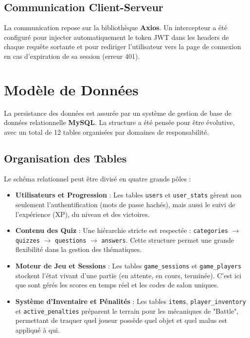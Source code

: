 \documentclass[12pt,a4paper]{article}
\begin{document}
\subsection{Communication Client-Serveur}
La communication repose sur la bibliothèque \textbf{Axios}. Un intercepteur a été configuré pour injecter automatiquement le token JWT dans les headers de chaque requête sortante et pour rediriger l'utilisateur vers la page de connexion en cas d'expiration de sa session (erreur 401).


\section{Modèle de Données}

La persistance des données est assurée par un système de gestion de base de données relationnelle \textbf{MySQL}. La structure a été pensée pour être évolutive, avec un total de 12 tables organisées par domaines de responsabilité.

\subsection{Organisation des Tables}
Le schéma relationnel peut être divisé en quatre grands pôles :
\begin{itemize}
    \item \textbf{Utilisateurs et Progression} : Les tables \texttt{users} et \texttt{user\_stats} gèrent non seulement l'authentification (mots de passe hachés), mais aussi le suivi de l'expérience (XP), du niveau et des victoires.
    \item \textbf{Contenu des Quiz} : Une hiérarchie stricte est respectée : \texttt{categories} $\rightarrow$ \texttt{quizzes} $\rightarrow$ \texttt{questions} $\rightarrow$ \texttt{answers}. Cette structure permet une grande flexibilité dans la gestion des thématiques.
    \item \textbf{Moteur de Jeu et Sessions} : Les tables \texttt{game\_sessions} et \texttt{game\_players} stockent l'état vivant d'une partie (en attente, en cours, terminée). C'est ici que sont gérés les scores en temps réel et les codes de salon uniques.
    \item \textbf{Système d'Inventaire et Pénalités} : Les tables \texttt{items}, \texttt{player\_inventory} et \texttt{active\_penalties} préparent le terrain pour les mécaniques de "Battle", permettant de traquer quel joueur possède quel objet et quel malus est appliqué à qui.
\end{itemize}
\end{document}
